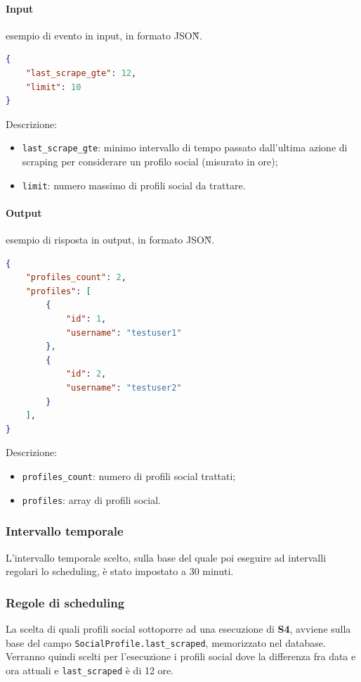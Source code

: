 \paragraph*{Input} esempio di evento in input, in formato JSON\G{}.
\begin{lstlisting}[language=JSON]
{
    "last_scrape_gte": 12,
    "limit": 10
}
\end{lstlisting}
Descrizione:
\begin{itemize}
    \item \verb|last_scrape_gte|: minimo intervallo di tempo passato dall'ultima azione di scraping
    per considerare un profilo social (misurato in ore);
    \item \verb|limit|: numero massimo di profili social da trattare. 
\end{itemize}

\paragraph*{Output} esempio di risposta in output, in formato JSON\G{}.
\begin{lstlisting}[language=JSON]
{
    "profiles_count": 2,
    "profiles": [
        {
            "id": 1,
            "username": "testuser1"
        },
        {
            "id": 2,
            "username": "testuser2"
        }
    ],
}
\end{lstlisting}
Descrizione:
\begin{itemize}
    \item \verb|profiles_count|: numero di profili social trattati;
    \item \verb|profiles|: array di profili social. 
\end{itemize}

\subsubsection{Intervallo temporale}
L'intervallo temporale scelto, sulla base del quale poi eseguire ad intervalli regolari lo scheduling,
è stato impostato a 30 minuti.

\subsubsection{Regole di scheduling}
La scelta di quali profili social sottoporre ad una esecuzione di \textbf{S4}, avviene sulla base del
campo \verb|SocialProfile.last_scraped|, memorizzato nel database. Verranno quindi scelti per l'esecuzione
i profili social dove la differenza fra data e ora attuali e \verb|last_scraped| è di 12 ore.
